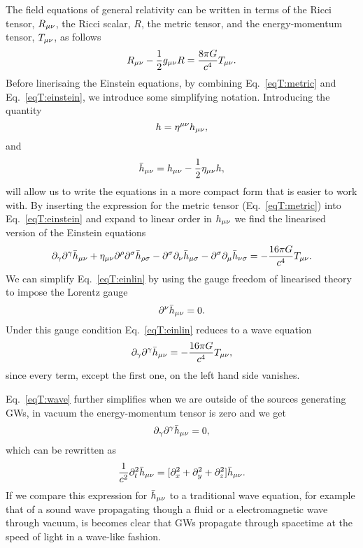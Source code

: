 The field equations of general relativity can
be written in terms of the Ricci tensor, $R_{\mu\nu}$, the Ricci scalar, $R$, the metric tensor,
and the energy-momentum tensor, $T_{\mu\nu}$, as follows
\begin{equation} \label{eqT:einstein}
R_{\mu\nu} - \frac{1}{2} g_{\mu\nu} R = \frac{8 \pi G}{c^4 } T_{\mu\nu}. 
\end{equation}
Before linerisaing the Einstein equations, by combining Eq.~\ref{eqT:metric} and Eq.~\ref{eqT:einstein}, we introduce some simplifying notation.
Introducing the quantity
\begin{equation} \label{eqT:h}
h = \eta^{\mu\nu}h_{\mu\nu},
\end{equation}
and
\begin{equation} \label{eqT:hbar}
\bar{h}_{\mu\nu} = h_{\mu\nu} - \frac{1}{2}\eta_{\mu\nu}h,
\end{equation}
will allow us to write the equations in a more compact form that is easier to work with.
By inserting the expression for the metric tensor (Eq.~\ref{eqT:metric}) into Eq.~\ref{eqT:einstein}
and expand to linear order in $h_{\mu\nu}$ we find the linearised version of the Einstein equations
\begin{equation} \label{eqT:einlin}
\partial_{\gamma} \partial^{\gamma} \bar{h}_{\mu\nu} + \eta_{\mu\nu} \partial^{\rho} \partial^{\sigma} \bar{h}_{\rho \sigma}
- \partial^{\sigma}\partial_{\nu}\bar{h}_{\mu \sigma} -  \partial^{\sigma}\partial_{\mu}\bar{h}_{\nu \sigma}
= -\frac{16 \pi G}{c^4 } T_{\mu\nu}.
\end{equation}
We can simplify Eq.~\ref{eqT:einlin} by using the gauge freedom of linearised theory to impose the Lorentz gauge
\begin{equation} \label{eqT:lor}
\partial^{\nu} \bar{h}_{\mu\nu} = 0.
\end{equation}
Under this gauge condition Eq.~\ref{eqT:einlin} reduces to a wave equation 
\begin{equation} \label{eqT:wave}
\partial_{\gamma} \partial^{\gamma} \bar{h}_{\mu\nu} = -\frac{16 \pi G}{c^4 } T_{\mu\nu},
\end{equation}
since every term, except the first one, on the left hand side vanishes. 

Eq.~\ref{eqT:wave} further simplifies when we are outside of the sources generating
GWs, in vacuum the energy-momentum tensor is zero and we get  
\begin{equation} \label{eqT:wavevacumm}
\partial_{\gamma} \partial^{\gamma} \bar{h}_{\mu\nu} = 0,
\end{equation}
which can be rewritten as
\begin{equation} \label{eqT:wavevacumm2}
\frac{1}{c^2} \partial_t^2 \bar{h}_{\mu\nu} = [ \partial^2_x  + \partial_y^2 + \partial_z^2] \bar{h}_{\mu\nu}.
\end{equation}
If we compare this expression for $\bar{h}_{\mu\nu}$ to a traditional wave equation, for example that of a sound wave
propagating though a fluid or a electromagnetic wave through vacuum, is becomes clear that GWs propagate through 
spacetime at the speed of light in a wave-like fashion.

